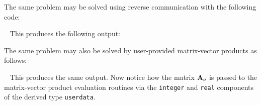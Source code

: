 \documentclass{galahad}
\begin{document}
The same problem may be solved using reverse communication with the
following code:

{\tt \small
\VerbatimInput{\packageexampleb}
}
\noindent
This produces the following output: \vspace*{-2mm}
{\tt \small
\VerbatimInput{\packageresultsb}
}
\noindent

The same problem may also be solved by user-provided matrix-vector
products as follows:

{\tt \small
\VerbatimInput{\packageexamplec}
}
\noindent
This produces the same output.
Now notice how the matrix ${\mathbf{A}}_o$ is passed to the matrix-vector product
evaluation routines via the {\tt integer} and
{\tt real} components of the derived type {\tt userdata}.

\end{document}
